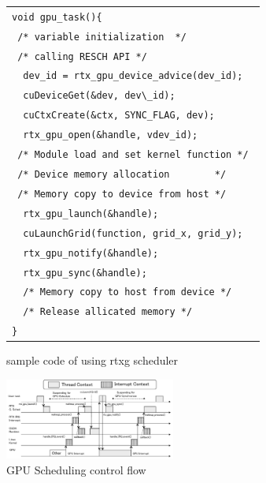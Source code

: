 \begin{figure}[t]
\begin{center}
\begin{tabular}{l}
\hline\hline
{\scriptsize \verb|void gpu_task(){        |}\\
{\scriptsize \verb| /* variable initialization  */        |}\\
{\scriptsize \verb| /* calling RESCH API */        |}\\
{\scriptsize \verb|  dev_id = rtx_gpu_device_advice(dev_id); |}\\
{\scriptsize \verb|  cuDeviceGet(&dev, dev\_id);           |}\\
{\scriptsize \verb|  cuCtxCreate(&ctx, SYNC_FLAG, dev);    |}\\
{\scriptsize \verb|  rtx_gpu_open(&handle, vdev_id);     |}\\
{\scriptsize \verb| /* Module load and set kernel function */ |}\\
{\scriptsize \verb| /* Device memory allocation        */ |}\\
{\scriptsize \verb| /* Memory copy to device from host */ |}\\
{\scriptsize \verb|  rtx_gpu_launch(&handle); |}\\
{\scriptsize \verb|  cuLaunchGrid(function, grid_x, grid_y); |}\\
{\scriptsize \verb|  rtx_gpu_notify(&handle); |}\\
{\scriptsize \verb|  rtx_gpu_sync(&handle);   |}\\
{\scriptsize \verb|  /* Memory copy to host from device */  |}\\
{\scriptsize \verb|  /* Release allicated memory */  |}\\
{\scriptsize \verb|}|}\\
\hline\hline
\end{tabular}
\caption{sample code of using rtxg scheduler}
\label{fig:sample}
\end{center}
\end{figure}

\begin{figure}[t]
\begin{center}
\includegraphics[width=0.5\textwidth]{img/gsched_controlflow.pdf}
\caption{GPU Scheduling control flow}
\end{center}
\label{fig:controlflow}
\end{figure}


